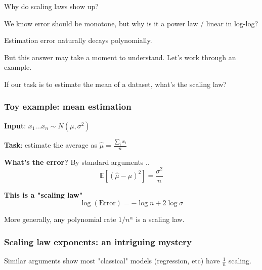 \documentclass[12pt,twoside]{article}
\begin{document}
\begin{question}
    Why do scaling laws show up?
\end{question}

We know error should be monotone, but why is it a power law / linear in log-log?

\begin{claim}
    Estimation error naturally decays polynomially.
\end{claim}

But this answer may take a moment to understand. Let's work through an example.

\begin{xample}
    If our task is to estimate the mean of a dataset, what's the scaling law?
\end{xample}

\subsubsection*{Toy example: mean estimation}

\begin{center}
    \textbf{Input}: \(x_1 \dots x_n \sim N(\mu, \sigma^2)\)
\end{center}

\begin{center}
    \textbf{Task}: estimate the average as \(\hat{\mu} = \frac{\sum_i x_i}{n}\)
\end{center}

\begin{center}
    \textbf{What's the error?} By standard arguments ..
    \[
        \mathbb{E}[(\hat{\mu} - \mu)^2] = \frac{\sigma^2}{n}
    \]
\end{center}

\begin{center}
    \textbf{This is a "scaling law"}
    \[
        \log(\text{Error}) = -\log n + 2 \log \sigma
    \]
\end{center}

\begin{center}
    More generally, any polynomial rate \(1 / n^{\alpha}\) is a scaling law.
\end{center}

\subsubsection*{Scaling law exponents: an intriguing mystery}

\begin{fact}
    Similar arguments show most "classical" models (regression, etc) have \(\frac{1}{n}\) scaling.
\end{fact}
\end{document}
